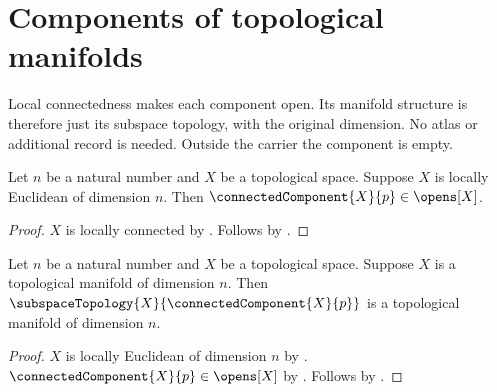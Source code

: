 \section{Components of topological manifolds}





Local connectedness makes each component open. Its manifold structure is
therefore just its subspace topology, with the original dimension. No atlas
or additional record is needed. Outside the carrier the component is empty.

\begin{theorem}\label{locally_euclidean_components_are_open}
    Let $n$ be a natural number and $X$ be a topological space.
    Suppose $X$ is locally Euclidean of dimension $n$.
    Then $\connectedComponent{X}{p}\in\opens[X]$.
\end{theorem}
\begin{proof}
    $X$ is locally connected by .
    Follows by .
\end{proof}

\begin{theorem}\label{component_of_topological_manifold}
    Let $n$ be a natural number and $X$ be a topological space.
    Suppose $X$ is a topological manifold of dimension $n$.
    Then $\subspaceTopology{X}{\connectedComponent{X}{p}}$ is a topological manifold of dimension $n$.
\end{theorem}
\begin{proof}
    $X$ is locally Euclidean of dimension $n$ by .
    $\connectedComponent{X}{p}\in\opens[X]$ by .
    Follows by .
\end{proof}
